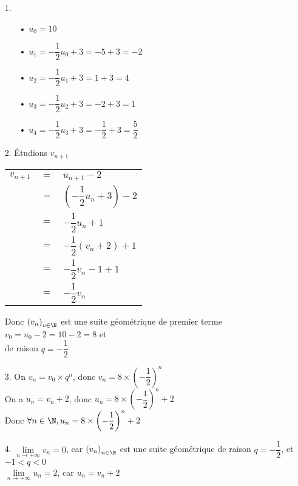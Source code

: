 \begin{itemize}
\item[1.]
\begin{itemize}
\item[•] $u_0 = 10$ \\
\item[•] $u_1 = -\dfrac{1}{2} u_0 + 3 = -5 + 3 = -2$ \\
\item[•] $u_2 = -\dfrac{1}{2} u_1 + 3 = 1 + 3 = 4$ \\
\item[•] $u_3 = -\dfrac{1}{2} u_2 + 3 = -2 + 3 = 1$ \\
\item[•] $u_4 = -\dfrac{1}{2} u_3 + 3 = -\dfrac{1}{2} + 3 = \dfrac{5}{2}$ \\
\end{itemize}
\item[2.] Étudions $v_{n+1}$ \\
\begin{tabular}{lll}
$v_{n+1}$ & $=$ & $u_{n+1} -2$ \vspace*{.3cm} \\
& $=$ & $\left(-\dfrac{1}{2}u_n + 3\right)-2$ \vspace*{.3cm} \\
& $=$ & $-\dfrac{1}{2}u_n +1$ \vspace*{.3cm} \\
& $=$ & $-\dfrac{1}{2} \left(v_n + 2\right) + 1$ \vspace*{.3cm} \\
& $=$ & $-\dfrac{1}{2} v_n - 1 + 1$ \vspace*{.3cm} \\
& $=$ & $-\dfrac{1}{2} v_n$ \\
\end{tabular}
\vspace*{.3cm}

Donc $\left(v_n\right)_{v \in \N}$ est une suite géométrique de premier terme $v_0 = u_0 - 2 = 10 - 2 = 8$ et \\ de raison $q = -\dfrac{1}{2}$ \vspace*{.3cm} \\

\item[3.] On $v_n = v_0 \times q^n$, donc $v_n = 8 \times \left(-\dfrac{1}{2}\right)^n$ \\

On a $u_n = v_n + 2$, donc $u_n = 8 \times \left(-\dfrac{1}{2}\right)^n + 2$ \\

Donc $\forall n \in \N, u_n = 8 \times \left(-\dfrac{1}{2}\right)^n + 2$ \\

\item[4.] $\lim\limits_{n \to +\infty} v_n = 0$, car $\left(v_n\right)_{n \in \N}$ est une suite géométrique de raison $q = -\dfrac{1}{2}$, et $ -1 < q < 0$ \\

$\lim\limits_{n \to +\infty} u_n = 2$, car $u_n = v_n + 2$ 
\end{itemize}

\vspace*{-5cm}